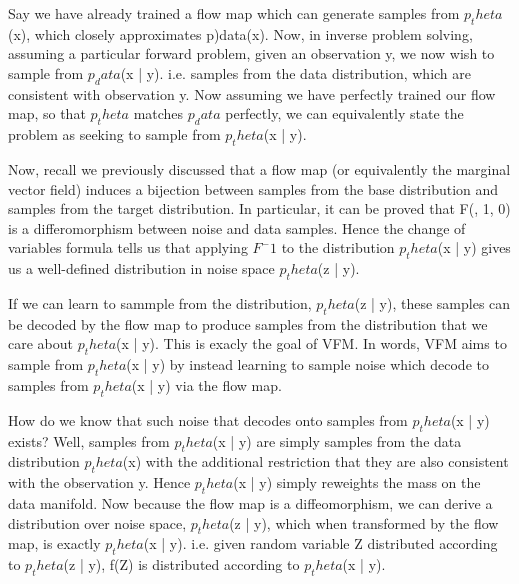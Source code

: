 \documentclass[12pt,a4paper]{report}
\begin{document}
Say we have already trained a flow map which can generate samples from $p_theta$(x), which closely approximates p)data(x). 
Now, in inverse problem solving, assuming a particular forward problem, given an observation y, we now wish to sample from $p_data$(x | y). 
i.e. samples from the data distribution, which are consistent with observation y.
Now assuming we have perfectly trained our flow map, so that $p_theta$ matches $p_data$ perfectly, we can equivalently state the problem as seeking to sample from $p_theta$(x | y). 

Now, recall we previously discussed that a flow map (or equivalently the marginal vector field) induces a bijection between samples from the base distribution and samples from the target distribution. 
In particular, it can be proved that F(, 1, 0) is a differomorphism between noise and data samples. 
Hence the change of variables formula tells us that applying $F^-1$ to the distribution $p_theta$(x | y) gives us a well-defined distribution in noise space $p_theta$(z | y). 

If we can learn to sammple from the distribution, $p_theta$(z | y), these samples can be decoded by the flow map to produce samples from the distribution that we care about $p_theta$(x | y). This is exacly the goal of VFM. In words, VFM aims to sample from $p_theta$(x | y) by instead learning to sample noise which decode to samples from $p_theta$(x | y) via the flow map. 

How do we know that such noise that decodes onto samples from $p_theta$(x | y) exists? 
Well, samples from $p_theta$(x | y) are simply samples from the data distribution $p_theta$(x) with the additional restriction that they are also consistent with the observation y. 
Hence $p_theta$(x | y) simply reweights the mass on the data manifold. 
Now because the flow map is a diffeomorphism, we can derive a distribution over noise space, $p_theta$(z | y), which when transformed by the flow map, is exactly $p_theta$(x | y). 
i.e. given random variable Z distributed according to $p_theta$(z | y), f(Z) is distributed according to $p_theta$(x | y). 
\end{document}
